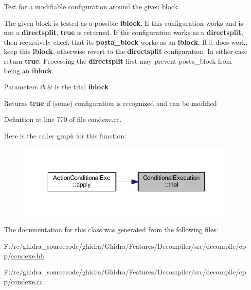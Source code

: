 Test for a modifiable configuration around the given block. 

The given block is tested as a possible {\bfseries{iblock}}. If this configuration works and is not a {\bfseries{directsplit}}, {\bfseries{true}} is returned. If the configuration works as a {\bfseries{directsplit}}, then recursively check that its {\bfseries{posta\+\_\+block}} works as an {\bfseries{iblock}}. If it does work, keep this {\bfseries{iblock}}, otherwise revert to the {\bfseries{directsplit}} configuration. In either case return {\bfseries{true}}. Processing the {\bfseries{directsplit}} first may prevent posta\+\_\+block from being an {\bfseries{iblock}}. 
\begin{DoxyParams}{Parameters}
{\em ib} & is the trial {\bfseries{iblock}} \\
\hline
\end{DoxyParams}
\begin{DoxyReturn}{Returns}
{\bfseries{true}} if (some) configuration is recognized and can be modified 
\end{DoxyReturn}


Definition at line 770 of file condexe.\+cc.

Here is the caller graph for this function\+:
\nopagebreak
\begin{figure}[H]
\begin{center}
\leavevmode
\includegraphics[width=334pt]{class_conditional_execution_abf756d499c20aba093c6f3d4214cb4a5_icgraph}
\end{center}
\end{figure}


The documentation for this class was generated from the following files\+:\begin{DoxyCompactItemize}
\item 
F\+:/re/ghidra\+\_\+sourcecode/ghidra/\+Ghidra/\+Features/\+Decompiler/src/decompile/cpp/\mbox{\hyperlink{condexe_8hh}{condexe.\+hh}}\item 
F\+:/re/ghidra\+\_\+sourcecode/ghidra/\+Ghidra/\+Features/\+Decompiler/src/decompile/cpp/\mbox{\hyperlink{condexe_8cc}{condexe.\+cc}}\end{DoxyCompactItemize}
